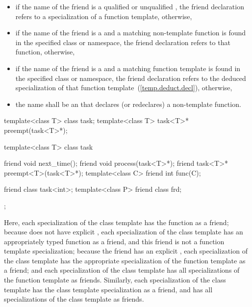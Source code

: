 \begin{itemize}
\item
if the name of the friend is a qualified or unqualified ,
the friend declaration refers to a specialization of a function
template, otherwise,
\item
if the name of the friend is a  and a matching non-template
function is found in the specified class or namespace, the friend
declaration refers to that function, otherwise,
\item
if the name of the friend is a  and a matching
function template
is found in the specified class
or namespace, the friend declaration refers to
the deduced specialization of that function template~(\ref{temp.deduct.decl}), otherwise,
\item
the name shall be an  that declares (or redeclares) a
non-template function.
\end{itemize}

\enterexample
\begin{codeblock}
template<class T> class task;
template<class T> task<T>* preempt(task<T>*);

template<class T> class task {
  friend void next_time();
  friend void process(task<T>*);
  friend task<T>* preempt<T>(task<T>*);
  template<class C> friend int func(C);

  friend class task<int>;
  template<class P> friend class frd;
};
\end{codeblock}

Here,
each specialization of the
class template has the function
as a friend;
because
does not have explicit
,
each specialization of the
class template has an appropriately typed function
as a friend, and this friend is not a function template specialization;
because the friend
has an explicit
,
each specialization of the
class template has the appropriate specialization of the function
template
as a friend;
and each specialization of the
class template has all specializations of the function template
as friends.
Similarly,
each specialization of the
class template has the class template specialization
as a friend, and has all specializations of the class template
as friends.
\exitexample

